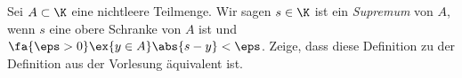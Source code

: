 \begin{exercise}
  Sei $A \subset \K$ eine nichtleere Teilmenge. Wir sagen $s \in \K$ ist ein
  \emph{Supremum} von $A$, wenn $s$ eine obere Schranke von $A$ ist und
  $\fa{\eps > 0} \ex{y \in A} \abs{s - y} < \eps$. Zeige, dass diese Definition
  zu der Definition aus der Vorlesung äquivalent ist.
\end{exercise}
